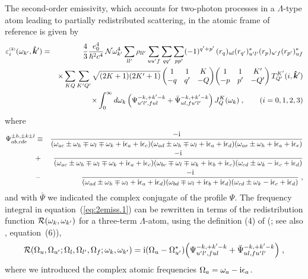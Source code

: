 \documentclass[preprint]{aastex}
\newcommand{\<}{{\kern-5pt}}
\newcommand{\thrj}[6]{\biggl(
	\begin{matrix}
	#1&#2&#3\\
	#4&#5&#6\\
	\end{matrix}\biggr)}
\newcommand{\apx}[1]{^{\mbox{\tiny{(#1)}}}}
\begin{document}
The second-order emissivity, which accounts for two-photon processes 
in a $\Lambda$-type atom leading to partially redistributed 
scattering, in the atomic 
frame of reference is given by \citep[see][]{Ca14}
%
\begin{eqnarray} \label{eq:2emiss.1}
\varepsilon\apx{2}_i(\omega_{k'},\bm{\hat k}')
&=&\frac{4}{3}\frac{e_0^4}{\hbar^2 c^4}\,{\cal N}\omega_{k'}^4
	\sum_{ll'}\rho_{ll'}\sum_{uu'f}
	\sum_{qq'}\sum_{pp'}(-1)^{q'+p'}\,
	(r_q)_{ul}(r_{q'})^\ast_{u'l'}
	(r_p)_{u'f}(r_{p'})^\ast_{uf} \nonumber \\
&&\times
	\sum_{KQ}\sum_{K'Q'}\sqrt{(2K+1)(2K'+1)}\,
	\thrj{1}{1}{K}{-q}{q'}{-Q}
	\thrj{1}{1}{K'}{-p}{p'}{-Q'}\,
	T^{K'}_{Q'}(i,\bm{\hat k}') \nonumber \\
&&\times \int_0^\infty d\omega_k\,
	\Bigl(
	\Psi_{u'l',ful}^{-k,+k'-k} + \bar\Psi_{ul,fu'l'}^{-k,+k'-k}
	\Bigr)\,
	J^K_Q(\omega_k)\;,\qquad (i=0,1,2,3)
\end{eqnarray}
%
where
%
\begin{eqnarray}
\Psi_{ab,cde}^{\pm h,\pm k\pm l}
&\equiv&
\frac{-{\rm i}}{
(\omega_{ac}\pm\omega_h\mp\omega_l\mp\omega_k
	+{\rm i}\epsilon_a+{\rm i}\epsilon_c)
(\omega_{ad}\pm\omega_h\mp\omega_l+{\rm i}\epsilon_a+{\rm i}\epsilon_d)
(\omega_{ae}\pm\omega_h+{\rm i}\epsilon_a+{\rm i}\epsilon_e)
} \nonumber \\
&+&\frac{-{\rm i}}{
(\omega_{ac}\pm\omega_h\mp\omega_l\mp\omega_k
	+{\rm i}\epsilon_a+{\rm i}\epsilon_c)
(\omega_{bc}\mp\omega_l\mp\omega_k+{\rm i}\epsilon_b+{\rm i}\epsilon_c)
(\omega_{cd}\pm\omega_k-{\rm i}\epsilon_c+{\rm i}\epsilon_d)
} \nonumber \\
&-&\frac{-{\rm i}}{
(\omega_{ad}\pm\omega_h\mp\omega_l+{\rm i}\epsilon_a+{\rm i}\epsilon_d)
(\omega_{bd}\mp\omega_l+{\rm i}\epsilon_b+{\rm i}\epsilon_d)
(\omega_{cd}\pm\omega_k-{\rm i}\epsilon_c+{\rm i}\epsilon_d)
}\;,
\end{eqnarray}
%
and with $\bar\Psi$ we indicated the complex conjugate of the profile
$\Psi$.
%
The frequency integral in equation~(\ref{eq:2emiss.1}) can be rewritten 
in terms of the redistribution function ${\cal R}(\omega_k,\omega_{k'})$ 
for a three-term $\Lambda$-atom, using the definition (4) of 
\citeauthor{Ca17} (\citeyear{Ca17};
see also \citealt{Ca14}, equation~(6)),
%
\begin{equation} \label{eq:red.gen}
{\cal R}(\Omega_u,\Omega_{u'};
	\Omega_l,\Omega_{l'},\Omega_{f};
	\omega_k,\omega_{k'})
= {\rm i}(\Omega_u-\Omega_{u'}^\ast)
	\Bigl(
	\Psi_{u'l',ful}^{-k,+k'-k} + \bar\Psi_{ul,fu'l'}^{-k,+k'-k}
	\Bigr)\;,
\end{equation}
%
where we introduced the complex atomic frequencies
$\Omega_a=\omega_a-{\rm i}\epsilon_a$.
\end{document}
